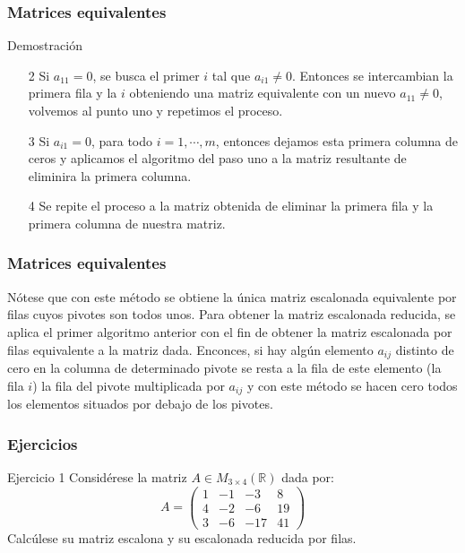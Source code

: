 \documentclass[aspectratio=169]{beamer}
\begin{document}
 \begin{frame}
  \frametitle{Matrices equivalentes}
 \begin{block}{Demostraci\'on}
\begin{itemize}
\item[2] Si $a_{11}= 0$, se busca el primer $i$ tal que $a_{i1}\neq 0$. Entonces se intercambian la primera fila y la $i$ obteniendo una matriz equivalente con un nuevo $a_{11} \neq 0$, volvemos al punto uno y repetimos el proceso.
\item[3] Si $a_{i1}= 0$,  para todo $i=1,\cdots,m$, entonces dejamos esta primera columna de ceros y aplicamos el algoritmo del paso uno a la matriz resultante de eliminira la primera columna.\item[4] Se repite el proceso a la matriz obtenida de eliminar la primera fila y la primera columna de nuestra matriz.
\end{itemize}
\end{block}
\end{frame} 
  
  
   \begin{frame}
  \frametitle{Matrices equivalentes}
N\'otese que con este m\'etodo se obtiene la \'unica matriz escalonada equivalente por filas cuyos pivotes son todos unos. Para obtener la matriz escalonada reducida, se aplica el primer algoritmo anterior con el fin de obtener la matriz escalonada por filas equivalente a la matriz dada. Enconces, si hay alg\'un elemento $a_{ij}$ distinto de cero en la columna de determinado pivote se resta a la fila de este elemento (la fila $i$) la fila del pivote multiplicada por $a_{ij}$ y con este m\'etodo se hacen cero todos los elementos situados por debajo de los pivotes.
\end{frame} 
  
  
  
   \begin{frame}
  \frametitle{Ejercicios}
   \begin{block}{Ejercicio 1}
Consid\'erese la matriz $A\in M_{3\times 4}(\mathbb{R})$ dada por:
\[A= \left(\begin{array}{cccc}1 & -1 & -3 & 8 \\4 & -2 & -6 & 19 \\3 & -6 & -17 & 41\end{array}\right)\]
Calc\'ulese su matriz escalona y su escalonada reducida por filas. 
\end{block}
  \end{frame} 
  
\end{document}
